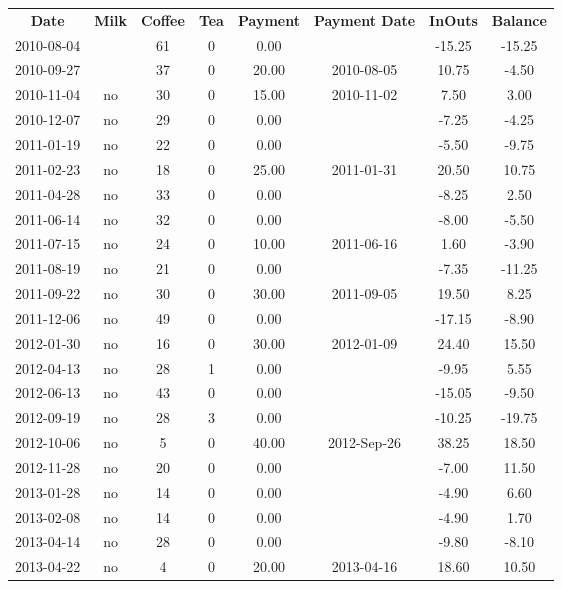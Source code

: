 \begin{center}
\begin{tabular}{cccccccc}
\textbf{Date} & \textbf{Milk} & \textbf{Coffee} & \textbf{Tea} & \textbf{Payment} & \textbf{Payment Date} & \textbf{InOuts} & \textbf{Balance} \\
2010-08-04 &  & 61 & 0 &  0.00 &  & -15.25 & -15.25\\ 
2010-09-27 &  & 37 & 0 & 20.00 & 2010-08-05 &  10.75 &  -4.50\\ 
2010-11-04 & no & 30 & 0 & 15.00 & 2010-11-02 &   7.50 &   3.00\\ 
2010-12-07 & no & 29 & 0 &  0.00 &  &  -7.25 &  -4.25\\ 
2011-01-19 & no & 22 & 0 &  0.00 &  &  -5.50 &  -9.75\\ 
2011-02-23 & no & 18 & 0 & 25.00 & 2011-01-31 &  20.50 &  10.75\\ 
2011-04-28 & no & 33 & 0 &  0.00 &  &  -8.25 &   2.50\\ 
2011-06-14 & no & 32 & 0 &  0.00 &  &  -8.00 &  -5.50\\ 
2011-07-15 & no & 24 & 0 & 10.00 & 2011-06-16 &   1.60 &  -3.90\\ 
2011-08-19 & no & 21 & 0 &  0.00 &  &  -7.35 & -11.25\\ 
2011-09-22 & no & 30 & 0 & 30.00 & 2011-09-05 &  19.50 &   8.25\\ 
2011-12-06 & no & 49 & 0 &  0.00 &  & -17.15 &  -8.90\\ 
2012-01-30 & no & 16 & 0 & 30.00 & 2012-01-09 &  24.40 &  15.50\\ 
2012-04-13 & no & 28 & 1 &  0.00 &  &  -9.95 &   5.55\\ 
2012-06-13 & no & 43 & 0 &  0.00 &  & -15.05 &  -9.50\\ 
2012-09-19 & no & 28 & 3 &  0.00 &  & -10.25 & -19.75\\ 
2012-10-06 & no &  5 & 0 & 40.00 & 2012-Sep-26 &  38.25 &  18.50\\ 
2012-11-28 & no & 20 & 0 &  0.00 &  &  -7.00 &  11.50\\ 
2013-01-28 & no & 14 & 0 &  0.00 &  &  -4.90 &   6.60\\ 
2013-02-08 & no & 14 & 0 &  0.00 &  &  -4.90 &   1.70\\ 
2013-04-14 & no & 28 & 0 &  0.00 &  &  -9.80 &  -8.10\\ 
2013-04-22 & no &  4 & 0 & 20.00 & 2013-04-16 &  18.60 &  10.50
\end{tabular}
\end{center}

